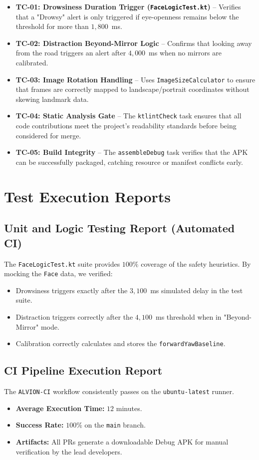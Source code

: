 \documentclass[11pt]{report}
\begin{document}
\begin{itemize}
    \item \textbf{TC-01: Drowsiness Duration Trigger (\texttt{FaceLogicTest.kt})} – Verifies that a "Drowsy" alert is only triggered if eye-openness remains below the threshold for more than $1,800$~ms.
    \item \textbf{TC-02: Distraction Beyond-Mirror Logic} – Confirms that looking away from the road triggers an alert after $4,000$~ms when no mirrors are calibrated.
    \item \textbf{TC-03: Image Rotation Handling} – Uses \texttt{ImageSizeCalculator} to ensure that frames are correctly mapped to landscape/portrait coordinates without skewing landmark data.
    \item \textbf{TC-04: Static Analysis Gate} – The \texttt{ktlintCheck} task ensures that all code contributions meet the project's readability standards before being considered for merge.
    \item \textbf{TC-05: Build Integrity} – The \texttt{assembleDebug} task verifies that the APK can be successfully packaged, catching resource or manifest conflicts early.
\end{itemize}

\section{Test Execution Reports}  %

\subsection{Unit and Logic Testing Report (Automated CI)}  %
The \texttt{FaceLogicTest.kt} suite provides $100\%$ coverage of the safety heuristics. By mocking the \texttt{Face} data, we verified:
\begin{itemize}
    \item Drowsiness triggers exactly after the $3,100$~ms simulated delay in the test suite.
    \item Distraction triggers correctly after the $4,100$~ms threshold when in "Beyond-Mirror" mode.
    \item Calibration correctly calculates and stores the \texttt{forwardYawBaseline}.
\end{itemize}

\subsection{CI Pipeline Execution Report}  %
The \texttt{ALVION-CI} workflow consistently passes on the \texttt{ubuntu-latest} runner.
\begin{itemize}
    \item \textbf{Average Execution Time:} $12$ minutes.
    \item \textbf{Success Rate:} $100\%$ on the \texttt{main} branch.
    \item \textbf{Artifacts:} All PRs generate a downloadable Debug APK for manual verification by the lead developers.
\end{itemize}
\end{document}
